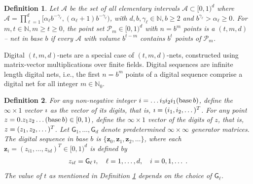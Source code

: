 \documentclass{svjour3}                     %
\let\vec\relax
\newtheorem{defn}{Definition}
\newcommand{\bm}[1]{\boldsymbol{#1}}
\newcommand{\naturals}{\mathbb{N}}
\newcommand{\vz}{\bm{z}}
\newcommand{\JRNote}[1]{{\textcolor{green}{JR: #1}}}
\begin{document}
\begin{defn}
	\label{defn:tmd_net}
	Let $\mathcal{A}$ be the set of all elementary intervals $\mathcal{A} \subset [0, 1)^d$ where
	$\mathcal{A} = \prod_{\ell=1}^d [\alpha_\ell b^{-\gamma_\ell} , (\alpha_\ell + 1) b^{-\gamma_\ell})$, 
	with $d,b,\gamma_\ell \in \naturals, b \ge 2$ 
	and $b^{\gamma_\ell}
	> \alpha_\ell \ge 0$. For $m,t \in \naturals, m \ge t \ge 0$, the point set $\mathcal{P}_m \in [0, 1)^d$ with $n = b^m$ points is a $(t, m, d)$ -- net in base $b$ if every $\mathcal{A}$ with volume $b^{t-m}$ contains $b^t$ points of $\mathcal{P}_m$.
\end{defn}

Digital $(t,m, d)$-nets are a special case of $(t,m, d)$-nets, constructed using matrix-vector multiplications over finite fields. Digital sequences are infinite length digital nets, i.e., the first $n=b^m$ points of a digital sequence comprise a digital net for all integer $m \in \naturals_0$.


\begin{defn}
	For any non-negative integer $i = \dots i_3 i_2 i_1(\textup{base} \, b)$, define the $\infty \times 1$ vector $\vec{\imath}$ as the vector of its digits, that is, $ \vec{\imath} = (i_1, i_2, \dots)^T$. 
	For any point $z = 0.z_1 z_2 \dots (\textup{base}\, b) \in [0, 1)$, define the $\infty \times 1$ vector of the digits of $z$, that is, $\vec{z} = (z_1, z_2, \dots)^T$. 
	Let $ \mathsf{G}_1, \dots , \mathsf{G}_d$ denote predetermined $\infty \times \infty$ generator matrices. 
	The digital sequence in \textup{base} $b$ is $\{\vz_0, \vz_1, \vz_2, \dots\}$, where each $\vz_i = ( z_{i1}, \dots , z_{id})^T \in [0, 1)^d$ is defined by
	\begin{align*}
	\vec{z}_{i\ell} = \mathsf{G}_{\ell} \, \vec{\imath}, \quad \ell = 1, \dots, d, \quad i = 0, 1, \dots \;.
	\end{align*}
	The value of $t$ as mentioned in Definition \ref{defn:tmd_net} depends on the choice of $\mathsf{G}_{\ell}$.
\end{defn}
\end{document}
